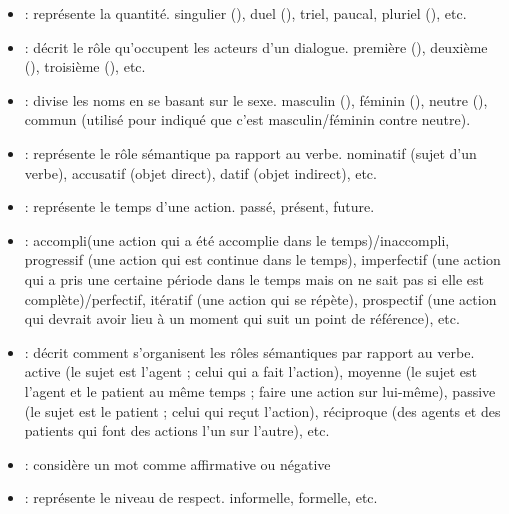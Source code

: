 \documentclass{KodeBook}
\begin{document}
\begin{itemize}
	\item {} : représente la quantité. 
	singulier (), duel (), triel, paucal, pluriel (), etc. 
	
	\item {} : décrit le rôle qu'occupent les acteurs d'un dialogue. 
	première (), deuxième (), troisième (), etc.
	
	\item {} : divise les noms en se basant sur le sexe. 
	masculin (), féminin (), neutre (), commun (utilisé pour indiqué que c'est masculin/féminin contre neutre).
	
	\item {} : représente le rôle sémantique pa rapport au verbe. 
	nominatif (sujet d'un verbe), accusatif (objet direct), datif (objet indirect), etc.
	
	\item {} : représente le temps d'une action. passé, présent, future.
	
	\item {} : accompli(une action qui a été accomplie dans le temps)/inaccompli, progressif (une action qui est continue dans le temps), imperfectif (une action qui a pris une certaine période dans le temps mais on ne sait pas si elle est complète)/perfectif, itératif (une action qui se répète), prospectif (une action qui devrait avoir lieu à un moment qui suit un point de référence), etc.
	
	\item {} : décrit comment s'organisent les rôles sémantiques par rapport au verbe.
	active (le sujet est l'agent ; celui qui a fait l'action), moyenne (le sujet est l'agent et le patient au même temps ; faire une action sur lui-même), passive (le sujet est le patient ; celui qui reçut l'action), réciproque (des agents et des patients qui font des actions l'un sur l'autre), etc.
	
	\item {} : considère un mot comme affirmative ou négative
	\item {} : représente le niveau de respect. informelle, formelle, etc.
\end{itemize}
\end{document}
